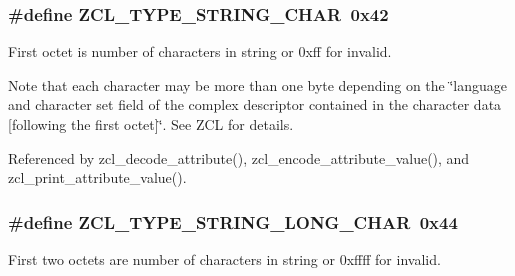 \hypertarget{group__zcl__types_ga64286e0c69e0ed344a6eb8756ac81f95}{
\subsubsection[{Z\-C\-L\-\_\-\-T\-Y\-P\-E\-\_\-\-S\-T\-R\-I\-N\-G\-\_\-\-C\-H\-A\-R}]{\setlength{\rightskip}{0pt plus 5cm}\#define Z\-C\-L\-\_\-\-T\-Y\-P\-E\-\_\-\-S\-T\-R\-I\-N\-G\-\_\-\-C\-H\-A\-R~0x42}}\label{group__zcl__types_ga64286e0c69e0ed344a6eb8756ac81f95}


First octet is number of characters in string or 0xff for invalid. 

Note that each character may be more than one byte depending on the \char`\"{}language and character set field of the complex descriptor contained
in the character data \mbox{[}following the first octet\mbox{]}\char`\"{}. See Z\-C\-L for details. 

Referenced by zcl\-\_\-decode\-\_\-attribute(), zcl\-\_\-encode\-\_\-attribute\-\_\-value(), and zcl\-\_\-print\-\_\-attribute\-\_\-value().

\hypertarget{group__zcl__types_gabb23537eaae74cc55233355c6ce5979e}{
\subsubsection[{Z\-C\-L\-\_\-\-T\-Y\-P\-E\-\_\-\-S\-T\-R\-I\-N\-G\-\_\-\-L\-O\-N\-G\-\_\-\-C\-H\-A\-R}]{\setlength{\rightskip}{0pt plus 5cm}\#define Z\-C\-L\-\_\-\-T\-Y\-P\-E\-\_\-\-S\-T\-R\-I\-N\-G\-\_\-\-L\-O\-N\-G\-\_\-\-C\-H\-A\-R~0x44}}\label{group__zcl__types_gabb23537eaae74cc55233355c6ce5979e}


First two octets are number of characters in string or 0xffff for invalid. 

